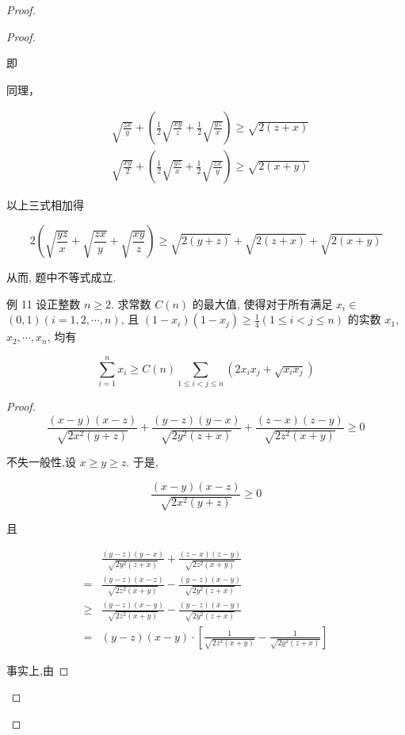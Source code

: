 \begin{proof}
\begin{example}
\begin{solution}
\begin{note}
\begin{solution}
\begin{proof}
\begin{example}
	即
	
	同理，
	
	$$
	\begin{aligned}
	& \sqrt{\frac{z x}{y}}+\left(\frac{1}{2} \sqrt{\frac{x y}{z}}+\frac{1}{2} \sqrt{\frac{y z}{x}}\right) \geqslant \sqrt{2(z+x)} \\
	& \sqrt{\frac{x y}{2}}+\left(\frac{1}{2} \sqrt{\frac{y z}{x}}+\frac{1}{2} \sqrt{\frac{z x}{y}}\right) \geqslant \sqrt{2(x+y)}
	\end{aligned}
	$$
	
	以上三式相加得
	
	$$
	2\left(\sqrt{\frac{y z}{x}}+\sqrt{\frac{z x}{y}}+\sqrt{\frac{x y}{z}}\right) \geqslant \sqrt{2(y+z)}+\sqrt{2(z+x)}+\sqrt{2(x+y)}
	$$
	
	从而, 题中不等式成立.
	
	例 11 设正整数 $n \geqslant 2$. 求常数 $C(n)$ 的最大值, 使得对于所有满足 $x_{i} \in$ $(0,1)(i=1,2, \cdots, n)$, 且 $\left(1-x_{i}\right)\left(1-x_{j}\right) \geqslant \frac{1}{4}(1 \leqslant i<j \leqslant n)$ 的实数 $x_{1}$, $x_{2}, \cdots, x_{n}$, 均有
	
	
	\begin{equation*}
	\sum_{i=1}^{n} x_{i} \geqslant C(n) \sum_{1 \leqslant i<j \leqslant n}\left(2 x_{i} x_{j}+\sqrt{x_{i} x_{j}}\right) \tag{1}
	\end{equation*}
\end{example}
\begin{proof}
	$$
	\frac{(x-y)(x-z)}{\sqrt{2 x^{2}(y+z)}}+\frac{(y-z)(y-x)}{\sqrt{2 y^{2}(z+x)}}+\frac{(z-x)(z-y)}{\sqrt{2 z^{2}(x+y)}} \geqslant 0
	$$
	
	不失一般性,设 $x \geqslant y \geqslant z$. 于是,
	
	$$
	\frac{(x-y)(x-z)}{\sqrt{2 x^{2}(y+z)}} \geqslant 0
	$$
	
	且
	
	
	\begin{align*}
	& \frac{(y-z)(y-x)}{\sqrt{2 y^{2}(z+x)}}+\frac{(z-x)(z-y)}{\sqrt{2 z^{2}(x+y)}} \\
	= & \frac{(y-z)(x-z)}{\sqrt{2 z^{2}(x+y)}}-\frac{(y-z)(x-y)}{\sqrt{2 y^{2}(z+x)}} \\
	\geqslant & \frac{(y-z)(x-y)}{\sqrt{2 z^{2}(x+y)}}-\frac{(y-z)(x-y)}{\sqrt{2 y^{2}(z+x)}} \\
	= & (y-z)(x-y) \cdot\left[\frac{1}{\sqrt{2 z^{2}(x+y)}}-\frac{1}{\sqrt{2 y^{2}(z+x)}}\right] \tag{1}
	\end{align*}
	
	
	事实上,由
	

\end{proof}
\end{proof}
\end{solution}
\end{note}
\end{solution}
\end{example}
\end{proof}
